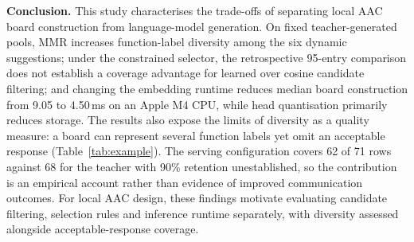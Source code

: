 \textbf{Conclusion.} This study characterises the trade-offs of separating local AAC board construction from language-model generation. On fixed teacher-generated pools, MMR increases function-label diversity among the six dynamic suggestions; under the constrained selector, the retrospective 95-entry comparison does not establish a coverage advantage for learned over cosine candidate filtering; and changing the embedding runtime reduces median board construction from 9.05 to 4.50\,ms on an Apple M4 CPU, while head quantisation primarily reduces storage. %
The results also expose the limits of diversity as a quality measure: a board can represent several function labels yet omit an acceptable response (Table~\ref{tab:example}). The serving configuration covers 62 of 71 rows against 68 for the teacher with 90\% retention unestablished, so the contribution is an empirical account rather than evidence of improved communication outcomes. For local AAC design, these findings motivate evaluating candidate filtering, selection rules and inference runtime separately, with diversity assessed alongside acceptable-response coverage. %

\clearpage

